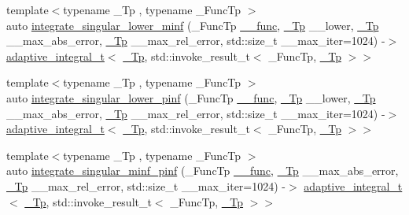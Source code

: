 \begin{DoxyCompactItemize}
{\footnotesize template$<$typename \+\_\+\+Tp , typename \+\_\+\+Func\+Tp $>$ }\\auto \hyperlink{namespace____gnu__cxx_a31bafd8ae702762989558b29593ffe6c}{integrate\+\_\+singular\+\_\+lower\+\_\+minf} (\+\_\+\+Func\+Tp \hyperlink{namespace____gnu__cxx_af2b2f0c7a2ae72b922b1afefae5a65b2}{\+\_\+\+\_\+func}, \hyperlink{namespace____gnu__cxx_a3b19a9c800ca194374ef9172290f7d79}{\+\_\+\+Tp} \+\_\+\+\_\+lower, \hyperlink{namespace____gnu__cxx_a3b19a9c800ca194374ef9172290f7d79}{\+\_\+\+Tp} \+\_\+\+\_\+max\+\_\+abs\+\_\+error, \hyperlink{namespace____gnu__cxx_a3b19a9c800ca194374ef9172290f7d79}{\+\_\+\+Tp} \+\_\+\+\_\+max\+\_\+rel\+\_\+error, std\+::size\+\_\+t \+\_\+\+\_\+max\+\_\+iter=1024) -\/$>$ \hyperlink{struct____gnu__cxx_1_1adaptive__integral__t}{adaptive\+\_\+integral\+\_\+t}$<$ \hyperlink{namespace____gnu__cxx_a3b19a9c800ca194374ef9172290f7d79}{\+\_\+\+Tp}, std\+::invoke\+\_\+result\+\_\+t$<$ \+\_\+\+Func\+Tp, \hyperlink{namespace____gnu__cxx_a3b19a9c800ca194374ef9172290f7d79}{\+\_\+\+Tp} $>$$>$
\item 
{\footnotesize template$<$typename \+\_\+\+Tp , typename \+\_\+\+Func\+Tp $>$ }\\auto \hyperlink{namespace____gnu__cxx_aead3b14ccced37c14f64ecd358a2b0c8}{integrate\+\_\+singular\+\_\+lower\+\_\+pinf} (\+\_\+\+Func\+Tp \hyperlink{namespace____gnu__cxx_af2b2f0c7a2ae72b922b1afefae5a65b2}{\+\_\+\+\_\+func}, \hyperlink{namespace____gnu__cxx_a3b19a9c800ca194374ef9172290f7d79}{\+\_\+\+Tp} \+\_\+\+\_\+lower, \hyperlink{namespace____gnu__cxx_a3b19a9c800ca194374ef9172290f7d79}{\+\_\+\+Tp} \+\_\+\+\_\+max\+\_\+abs\+\_\+error, \hyperlink{namespace____gnu__cxx_a3b19a9c800ca194374ef9172290f7d79}{\+\_\+\+Tp} \+\_\+\+\_\+max\+\_\+rel\+\_\+error, std\+::size\+\_\+t \+\_\+\+\_\+max\+\_\+iter=1024) -\/$>$ \hyperlink{struct____gnu__cxx_1_1adaptive__integral__t}{adaptive\+\_\+integral\+\_\+t}$<$ \hyperlink{namespace____gnu__cxx_a3b19a9c800ca194374ef9172290f7d79}{\+\_\+\+Tp}, std\+::invoke\+\_\+result\+\_\+t$<$ \+\_\+\+Func\+Tp, \hyperlink{namespace____gnu__cxx_a3b19a9c800ca194374ef9172290f7d79}{\+\_\+\+Tp} $>$$>$
\item 
{\footnotesize template$<$typename \+\_\+\+Tp , typename \+\_\+\+Func\+Tp $>$ }\\auto \hyperlink{namespace____gnu__cxx_a10e839f46ed2fda3a57ed7710a51cfbc}{integrate\+\_\+singular\+\_\+minf\+\_\+pinf} (\+\_\+\+Func\+Tp \hyperlink{namespace____gnu__cxx_af2b2f0c7a2ae72b922b1afefae5a65b2}{\+\_\+\+\_\+func}, \hyperlink{namespace____gnu__cxx_a3b19a9c800ca194374ef9172290f7d79}{\+\_\+\+Tp} \+\_\+\+\_\+max\+\_\+abs\+\_\+error, \hyperlink{namespace____gnu__cxx_a3b19a9c800ca194374ef9172290f7d79}{\+\_\+\+Tp} \+\_\+\+\_\+max\+\_\+rel\+\_\+error, std\+::size\+\_\+t \+\_\+\+\_\+max\+\_\+iter=1024) -\/$>$ \hyperlink{struct____gnu__cxx_1_1adaptive__integral__t}{adaptive\+\_\+integral\+\_\+t}$<$ \hyperlink{namespace____gnu__cxx_a3b19a9c800ca194374ef9172290f7d79}{\+\_\+\+Tp}, std\+::invoke\+\_\+result\+\_\+t$<$ \+\_\+\+Func\+Tp, \hyperlink{namespace____gnu__cxx_a3b19a9c800ca194374ef9172290f7d79}{\+\_\+\+Tp} $>$$>$
$$
\end{DoxyCompactItemize}
